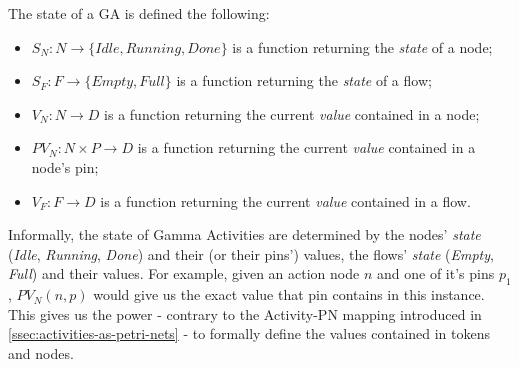\begin{definition}
	The state of a GA is defined the following:
	
	\begin{itemize}
		\item \(S_N : N \rightarrow \{ \mathit{Idle}, \mathit{Running}, \mathit{Done} \} \) is a function returning the \emph{state} of a node;
		\item \(S_F : F \rightarrow \{ \mathit{Empty}, \mathit{Full} \} \) is a function returning the \emph{state} of a flow;
		\item \(V_N : N \rightarrow D \) is a function returning the current \emph{value} contained in a node;
		\item \(\mathit{PV}_N : N \times P \rightarrow D \) is a function returning the current \emph{value} contained in a node's pin;
		\item \(V_F : F \rightarrow D \) is a function returning the current \emph{value} contained in a flow.
	\end{itemize}
	
\end{definition}\label{def:activity-state}

Informally, the state of Gamma Activities are determined by the nodes' \emph{state} (\emph{Idle}, \emph{Running}, \emph{Done}) and their (or their pins') values, the flows' \emph{state} (\emph{Empty}, \emph{Full}) and their values. For example, given an action node \(n\) and one of it's pins \(p_1\), \(\mathit{PV}_N(n, p)\) would give us the exact value that pin contains in this instance. This gives us the power - contrary to the Activity-PN mapping introduced in \autoref{ssec:activities-as-petri-nets} - to formally define the values contained in tokens and nodes.

